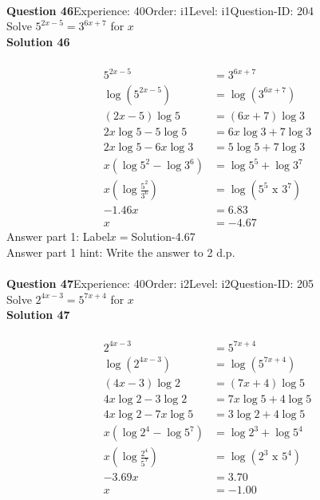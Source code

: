 \documentclass{article}
\begin{document}
\\[4pt]
\noindent\textbf{Question 46}\hspace{20pt}Experience: 40\hspace{20pt}Order: i1\hspace{20pt}Level: i1\hspace{20pt}Question-ID: 204\\[2pt]
Solve $5^{2x-5}=3^{6x+7}$ for $x$\\[4pt]
\noindent\textbf{Solution 46}\\[2pt]
\\[-35pt]\begin{align*}
5^{2x-5}&=3^{6x+7}\\[2pt]
\log(5^{2x-5})&=\log(3^{6x+7})\\[2pt]
(2x-5)\log5&=(6x+7)\log3\\[2pt]
2x\log5-5\log5&=6x\log3+7\log3\\[2pt]
2x\log5-6x\log3&=5\log5+7\log3\\[2pt]
x(\log5^2-\log3^6)&=\log5^5+\log3^7\\[2pt]
x\left(\log\displaystyle\frac{5^2}{3^6}\right)&=\log(5^5\,\,\text{x}\,\,3^7)\\[2pt]
-1.46x&=6.83\\[2pt]
x&=-4.67
\end{align*}
Answer part 1: \hspace{10pt}Label\hspace{10pt}$x=$\hspace{10pt}Solution\hspace{10pt}-4.67\\
Answer part 1 hint: \hspace{15pt}Write the answer to 2 d.p.\\
\\[4pt]
\noindent\textbf{Question 47}\hspace{20pt}Experience: 40\hspace{20pt}Order: i2\hspace{20pt}Level: i2\hspace{20pt}Question-ID: 205\\[2pt]
Solve $2^{4x-3}=5^{7x+4}$ for $x$\\[4pt]
\noindent\textbf{Solution 47}\\[2pt]
\\[-35pt]\begin{align*}
2^{4x-3}&=5^{7x+4}\\[2pt]
\log(2^{4x-3})&=\log(5^{7x+4})\\[2pt]
(4x-3)\log2&=(7x+4)\log5\\[2pt]
4x\log2-3\log2&=7x\log5+4\log5\\[2pt]
4x\log2-7x\log5&=3\log2+4\log5\\[2pt]
x(\log2^4-\log5^7)&=\log2^3+\log5^4\\[2pt]
x\left(\log\displaystyle\frac{2^4}{5^7}\right)&=\log(2^3\,\,\text{x}\,\,5^4)\\[2pt]
-3.69x&=3.70\\[2pt]
x&=-1.00
\end{align*}
\end{document}
